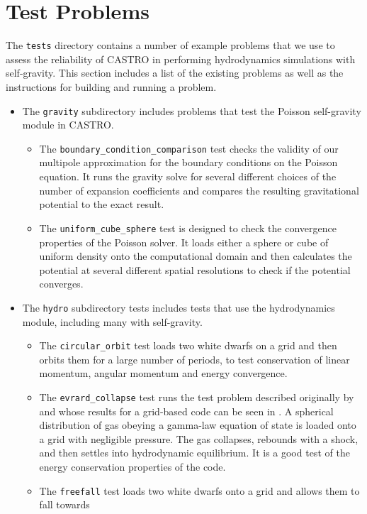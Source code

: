 \documentclass[12pt]{book}
\begin{document}
\chapter{Test Problems}

The \texttt{tests} directory contains a number of example problems that we use
to assess the reliability of CASTRO in performing hydrodynamics simulations 
with self-gravity. This section includes a list of the existing problems 
as well as the instructions for building and running a problem.

\begin{itemize}
  \item The \texttt{gravity} subdirectory includes problems that test the Poisson 
self-gravity module in CASTRO.
  \begin{itemize}
    \item The \texttt{boundary\_condition\_comparison} test checks the validity of our 
multipole approximation for the boundary conditions on the Poisson equation. It runs
the gravity solve for several different choices of the number of expansion coefficients
and compares the resulting gravitational potential to the exact result.
    \item The \texttt{uniform\_cube\_sphere} test is designed to check the convergence
properties of the Poisson solver. It loads either a sphere or cube of uniform density
onto the computational domain and then calculates the potential at several different
spatial resolutions to check if the potential converges.
  \end{itemize}
  \item The \texttt{hydro} subdirectory tests includes tests that use the hydrodynamics 
module, including many with self-gravity.
  \begin{itemize}
    \item The \texttt{circular\_orbit} test loads two white dwarfs on a grid and then orbits
them for a large number of periods, to test conservation of linear momentum,
angular momentum and energy convergence.
    \item The \texttt{evrard\_collapse} test runs the test problem described originally by 
\cite{evrard:1988} and whose results for a grid-based code can be seen in \cite{arepo}. A spherical
distribution of gas obeying a gamma-law equation of state is loaded onto a grid with negligible 
pressure. The gas collapses, rebounds with a shock, and then settles into hydrodynamic equilibrium.
It is a good test of the energy conservation properties of the code.
    \item The \texttt{freefall} test loads two white dwarfs onto a grid and allows them to fall towards

\end{itemize}
\end{itemize}
\end{document}
